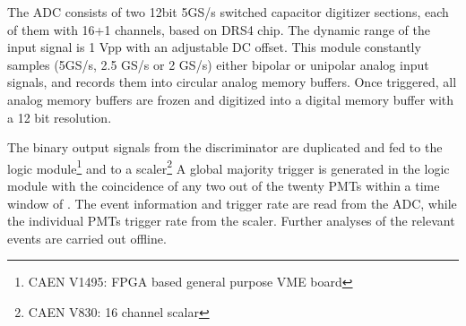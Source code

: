 

The ADC consists of two 12bit 5GS/s switched capacitor digitizer sections, 
each of them with 16+1 channels, based on DRS4 chip. The dynamic range of the input signal is 1 
Vpp with an adjustable DC offset. This module constantly samples (5GS/s, 2.5 GS/s or 2 GS/s) either bipolar or unipolar analog input 
signals, and records them into circular 
analog memory buffers. Once triggered, all analog memory 
buffers are frozen and digitized into a digital memory buffer 
with a 12 bit resolution. 

The binary output signals from the discriminator are duplicated and fed to 
the logic module\footnote{CAEN V1495: FPGA based general purpose VME board} and to a scaler\footnote{CAEN V830: 16 channel scalar} 
A global majority trigger is generated in the logic module with the coincidence of any two out of 
the twenty PMTs within a time window of . The event information and trigger rate are read from the ADC, while the 
individual PMTs trigger rate from the scaler. Further analyses of the relevant events are carried out offline.










